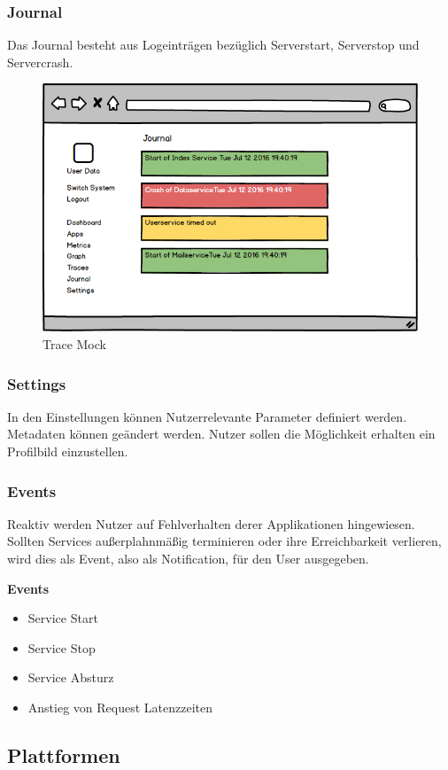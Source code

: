 \subsubsection{Journal}

Das Journal besteht aus Logeinträgen bezüglich Serverstart, Serverstop und Servercrash.

\begin{figure}[h]
 \centering
 \includegraphics[width=0.6\linewidth]{kapitel1/mocks/journal.png}
 \caption{Trace Mock}
\end{figure}

\subsubsection{Settings}

In den Einstellungen können Nutzerrelevante Parameter definiert werden. Metadaten können geändert werden.
Nutzer sollen die Möglichkeit erhalten ein Profilbild einzustellen.

\subsubsection{Events}

Reaktiv werden Nutzer auf Fehlverhalten derer Applikationen hingewiesen. Sollten Services außerplahnmäßig terminieren oder ihre Erreichbarkeit verlieren,
wird dies als Event, also als Notification, für den User ausgegeben.

\textbf{Events}
\begin{itemize}
\item Service Start
\item Service Stop
\item Service Absturz
\item Anstieg von Request Latenzzeiten
\end{itemize}


\subsection{Plattformen}

